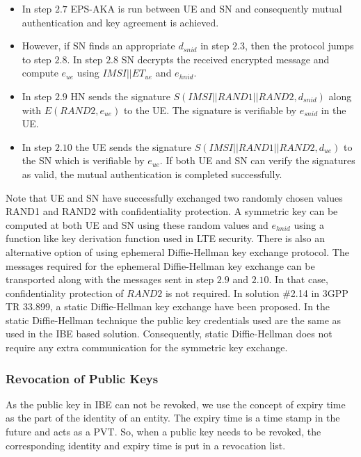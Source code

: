\documentclass[runningheads,a4paper]{llncs} %
\begin{document}
\begin{itemize}
\item In step $2.7$ EPS-AKA is run between UE and SN and consequently mutual authentication and key agreement is achieved.

\item However, if SN finds an appropriate $d_{snid}$ in step $2.3$, then the protocol jumps to step $2.8$. In step $2.8$ SN decrypts the received encrypted message and compute $e_{ue}$ using $IMSI||ET_{ue}$ and $e_{hnid}$. 

\item In step $2.9$ HN sends the signature $S(IMSI||RAND1||RAND2,d_{snid})$ along with $E(RAND2,e_{ue})$ to the UE. The signature is verifiable by $e_{snid}$ in the UE. 

\item In step $2.10$ the UE sends the signature $S(IMSI||RAND1||RAND2,d_{ue})$ to the SN which is verifiable by $e_{ue}$. If both UE and SN can verify the signatures as valid, the mutual authentication is completed successfully.

\end{itemize}

Note that UE and SN have successfully exchanged two randomly chosen values RAND1 and RAND2 with confidentiality protection. A symmetric key can be computed at both UE and SN using these random values and $e_{hnid}$ using a function like key derivation function used in LTE security. There is also an alternative option of using ephemeral Diffie-Hellman key exchange protocol. The messages required for the ephemeral Diffie-Hellman key exchange can be transported along with the messages sent in step $2.9$ and $2.10$. In that case, confidentiality protection of $RAND2$ is not required. In solution \#2.14 in 3GPP TR 33.899, a static Diffie-Hellman key exchange have been proposed. In the static Diffie-Hellman technique the public key credentials used are the same as used in the IBE based solution. Consequently, static Diffie-Hellman does not require any extra communication for the symmetric key exchange.

\subsubsection{Revocation of Public Keys}
As the public key in IBE can not be revoked, we use the concept of expiry time as the part of the identity of an entity. The expiry time is a time stamp in the future and acts as a PVT. So, when a public key needs to be revoked, the corresponding identity and expiry time is put in a revocation list. 
\end{document}
